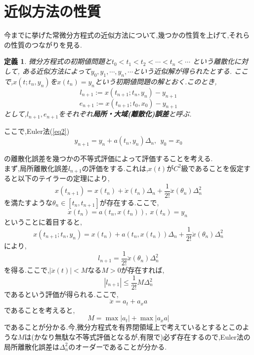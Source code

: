 \documentclass[a4paper,dvipdfmx]{jreport}
\numberwithin{equation}{section}
\newtheorem{Def}     [Thm]{定義}
\renewenvironment{leftbar}{%
  \def\FrameCommand{\vrule width 1pt \hspace{10pt}}%
  \MakeFramed {\advance\hsize-\width \FrameRestore}}%
 {\endMakeFramed}
\def\defb{\begin{leftbar}\begin{Def}}
\def\defx{\end{Def}\end{leftbar}}
\def\eq{\begin{equation}}
\def\eqx{\end{equation}}
\begin{document}
\section{近似方法の性質}
今までに挙げた常微分方程式の近似方法について,幾つかの性質を上げて,それらの性質のつながりを見る.
\defb
微分方程式の初期値問題と$t_0 < t_1 < t_2 < \cdots < t_n < \cdots $ という離散化に対して,
ある近似方法によって$y_0,y_1,\cdots,y_n,\cdots$という近似解が得られたとする.
ここで,$x(t;t_n,y_n)$を$x(t_n)=y_n$という初期値問題の解とおく.このとき,
\eq
\label{eq_error}
l_{n+1} := x(t_{n+1};t_n,y_n) - y_{n+1}
\eqx
\eq
e_{n+1} := x(t_{n+1};t_0,x_0) - y_{n+1}
\eqx
として,$l_{n+1},e_{n+1}$をそれぞれ{\bf 局所・大域(離散化)誤差}と呼ぶ.
\defx

ここで,Euler法(\ref{eq2})
\[
y_{n+1} = y_n + a(t_n,y_n)\Delta_n,\  \  y_0 = x_0
\]

の離散化誤差を幾つかの不等式評価によって評価することを考える.\\
まず,局所離散化誤差$l_{n+1}$の評価をする.これは,$x(t)$が$C^2$級であることを仮定すると以下のテイラーの定理により,
\[
x(t_{n+1}) = x(t_n) + \dot{x}(t_n)\Delta_n + \frac{1}{2!} \ddot{x}(\theta_n)\Delta_n^2
\]
を満たすような$\theta_n \in [t_n , t_{n+1}]$が存在する.ここで,\\
\[
\dot{x}(t_n) = a(t_n,x(t_n))  , \ x(t_n) = y_n \ 
\]
ということに着目すると,
\[
x(t_{n+1};t_n,y_n) = x(t_n) + a(t_n,x(t_n))\Delta_n + \frac{1}{2!} \ddot{x}(\theta_n)\Delta_n^2
\]
により,
\eq
l_{n+1} = \frac{1}{2!} \ddot{x}(\theta_n)\Delta_n^2
\eqx
を得る.ここで,$ |\ddot{x}(t)| < M$なる$M>0$が存在すれば,
\eq
|l_{n+1}| \le  \frac{1}{2!} M \Delta_n^2
\eqx
であるという評価が得られる.ここで,
\[
\ddot{x} = a_t + a_x a
\]
であることを考えると,
\[
M = \max|a_t| + \max |a_x a|
\]
であることが分かる.今,微分方程式を有界閉領域上で考えているとするとこのような$M$は(かなり無駄な不等式評価となるが,有限で)必ず存在するので,Euler法の局所離散化誤差は$\Delta_n^2$のオーダーであることが分かる.\par
\end{document}
